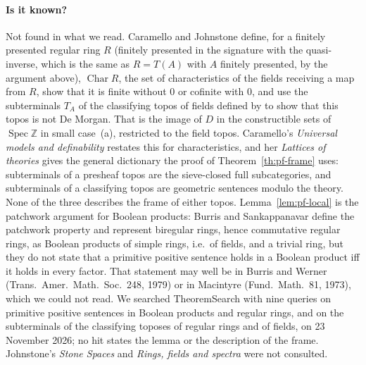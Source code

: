 \paragraph{Is it known?} Not found in what we read. Caramello and Johnstone \cite[p.~2 and Lemmas~1.1--1.2]{caramello-johnstone} define, for a finitely presented regular ring $R$ (finitely presented in the signature with the quasi-inverse, which is the same as $R = T(A)$ with $A$ finitely presented, by the argument above), $\operatorname{Char}R$, the set of characteristics of the fields receiving a map from $R$, show that it is finite without $0$ or cofinite with $0$, and use the subterminals $T_A$ of the classifying topos of fields defined by  to show that this topos is not De Morgan. That is the image of $D$ in the constructible sets of $\operatorname{Spec}\mathbb Z$ in small case~(a), restricted to the field topos. Caramello's \emph{Universal models and definability} \cite[\S7(ii)]{caramello-universal} restates this for characteristics, and her \emph{Lattices of theories} \cite[\S7.1]{caramello-lattices} gives the general dictionary the proof of Theorem~\ref{th:pf-frame} uses: subterminals of a presheaf topos are the sieve-closed full subcategories, and subterminals of a classifying topos are geometric sentences modulo the theory. None of the three describes the frame of either topos. Lemma~\ref{lem:pf-local} is the patchwork argument for Boolean products: Burris and Sankappanavar \cite[Def.~IV.8.1 and the example of Dauns and Hofmann after Cor.~IV.8.14]{burris-sankappanavar} define the patchwork property and represent biregular rings, hence commutative regular rings, as Boolean products of simple rings, i.e.\ of fields, and a trivial ring, but they do not state that a primitive positive sentence holds in a Boolean product iff it holds in every factor. That statement may well be in Burris and Werner (Trans.\ Amer.\ Math.\ Soc.\ 248, 1979) or in Macintyre (Fund.\ Math.\ 81, 1973), which we could not read. We searched TheoremSearch with nine queries on primitive positive sentences in Boolean products and regular rings, and on the subterminals of the classifying toposes of regular rings and of fields, on 23 November 2026; no hit states the lemma or the description of the frame. Johnstone's \emph{Stone Spaces} and \emph{Rings, fields and spectra} were not consulted.
